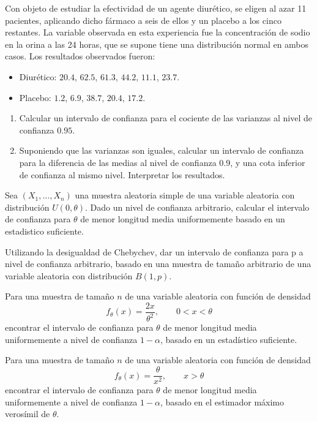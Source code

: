 \begin{ejercicio}
    Con objeto de estudiar la efectividad de un agente diurético, se eligen al azar 11 pacientes, aplicando dicho fármaco a seis de ellos y un placebo a los cinco restantes. La variable observada en esta experiencia fue la concentración de sodio en la orina a las 24 horas, que se supone tiene una distribución normal en ambos casos. Los resultados observados fueron:
    \begin{itemize}
        \item Diurético: $20.4$, $62.5$, $61.3$, $44.2$, $11.1$, $23.7$.
        \item Placebo: $1.2$, $6.9$, $38.7$, $20.4$, $17.2$.
    \end{itemize}
    \begin{enumerate}[label=\alph*)]
        \item Calcular un intervalo de confianza para el cociente de las varianzas al nivel de confianza $0.95$.
        \item Suponiendo que las varianzas son iguales, calcular un intervalo de confianza para la diferencia de las medias al nivel de confianza $0.9$, y una cota inferior de confianza al mismo nivel. Interpretar los resultados.
    \end{enumerate}
\end{ejercicio}

\begin{ejercicio}
    Sea $(X_1, \ldots, X_n)$ una muestra aleatoria simple de una variable aleatoria con distribución $U(0,\theta)$. Dado un nivel de confianza arbitrario, calcular el intervalo de confianza para $\theta$ de menor longitud media uniformemente basado en un estadistico suficiente.
\end{ejercicio}

\begin{ejercicio}
    Utilizando la desigualdad de Chebychev, dar un intervalo de confianza para p a nivel de confianza arbitrario, basado en una muestra de tamaño arbitrario de una variable aleatoria con distribución $B(1,p)$.
\end{ejercicio}

\begin{ejercicio}
    Para una muestra de tamaño $n$ de una variable aleatoria con función de densidad
    \begin{equation*}
        f_\theta(x) = \frac{2x}{\theta^2}, \qquad 0<x<\theta
    \end{equation*}
    encontrar el intervalo de confianza para $\theta$ de menor longitud media uniformemente a nivel de confianza $1-\alpha$, basado en un estadístico suficiente.
\end{ejercicio}

\begin{ejercicio}
    Para una muestra de tamaño $n$ de una variable aleatoria con función de densidad
    \begin{equation*}
        f_\theta(x) = \frac{\theta}{x^2}, \qquad x>\theta
    \end{equation*}
    encontrar el intervalo de confianza para $\theta$ de menor longitud media uniformemente a nivel de confianza $1 - \alpha$, basado en el estimador máximo verosímil de $\theta$.
\end{ejercicio}
